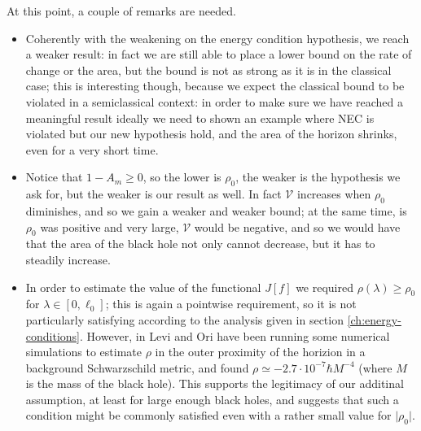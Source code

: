 \begin{remark}
	At this point, a couple of remarks are needed. 

	\begin{itemize}
		\item[\ding{99}] Coherently with the weakening on the energy condition hypothesis, we reach a weaker result: in fact we are still able to place a lower bound on the rate of change or the area, but the bound is not as strong as it is in the classical case; this is interesting though, because we expect the classical bound to be violated in a semiclassical context: in order to make sure we have reached a meaningful result ideally we need to shown an example where NEC is violated but our new hypothesis hold, and the area of the horizon shrinks, even for a very short time.
  		\item[\ding{99}] Notice that \(1-A_m \ge 0\), so the lower is \(\rho_0\), the weaker is the hypothesis we ask for, but the weaker is our result as well. In fact \(\mathcal{V}\) increases when \(\rho_0\) diminishes, and so we gain a weaker and weaker bound; at the same time, is \(\rho_0\) was positive and very large, \(\mathcal{V}\) would be negative, and so we would have that the area of the black hole not only cannot decrease, but it has to steadily increase.
    	\item[\ding{99}] In order to estimate the value of the functional \(J[f]\) we required \(\rho (\lambda)\ge\rho_0\) for \(\lambda\in [0, \ell_0]\); this is again a pointwise requirement, so it is not particularly satisfying according to the analysis given in section \ref{ch:energy-conditions}. However, in \cite{levi2016versatile} Levi and Ori have been running some numerical simulations to estimate \(\rho\) in the outer proximity of the horizion in a background Schwarzschild metric, and found \(\rho \simeq -2.7\cdot 10^{-7} \hbar M^{-4}\) (where \(M\) is the mass of the black hole). This supports the legitimacy of our additinal assumption, at least for large enough black holes, and suggests that such a condition might be commonly satisfied even with a rather small value for \(\vert\rho_0\vert\).
	\end{itemize}
	
\end{remark}